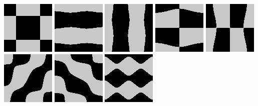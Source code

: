 \includegraphics{o/chladni_009.png}
\includegraphics{o/chladni_010.png}
\includegraphics{o/chladni_011.png}
\includegraphics{o/chladni_012.png}
\includegraphics{o/chladni_013.png}
\includegraphics{o/chladni_014.png}
\includegraphics{o/chladni_015.png}
\includegraphics{o/chladni_016.png}

